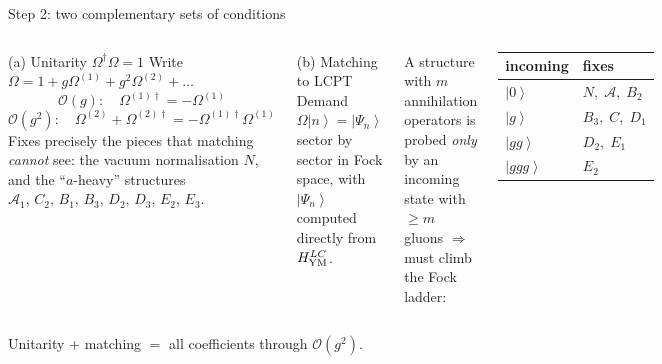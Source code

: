 \documentclass[9pt,aspectratio=169]{beamer}
\newcommand{\hl}[1]{\textcolor{acc}{#1}}
\newcommand{\Om}{\Omega}
\newcommand{\ket}[1]{\left|#1\right\rangle}
\begin{document}
\begin{frame}{Step 2: two complementary sets of conditions}
\begin{columns}[T,onlytextwidth]
\begin{block}{(a) Unitarity $\Om^{\dagger}\Om=1$}
Write $\Om=1+g\Om^{(1)}+g^{2}\Om^{(2)}+\dots$
\[
\mathcal{O}(g):\quad \Om^{(1)\dagger}=-\Om^{(1)}
\]
\[
\mathcal{O}(g^{2}):\quad \Om^{(2)}+\Om^{(2)\dagger}=-\Om^{(1)\dagger}\Om^{(1)}
\]
{\small Fixes precisely the pieces that matching \emph{cannot} see:
the vacuum normalisation $N$, and the ``$a$-heavy'' structures
$\mathcal{A}_1,\,C_2,\,B_1,\,B_3,\,D_2,\,D_3,\,E_2,\,E_3$.}
\end{block}

\begin{block}{(b) Matching to LCPT}
Demand $\Om\ket{n}=\ket{\Psi_{n}}$ sector by sector in Fock space, with
$\ket{\Psi_n}$ computed \hl{directly from $H^{LC}_{\rm YM}$}.
\end{block}
\medskip
{\small A structure with $m$ annihilation operators is probed \emph{only} by an
incoming state with $\ge m$ gluons $\Rightarrow$ must climb the Fock ladder:}
\begin{center}\small
\begin{tabular}{ll}
\toprule
incoming & fixes\\
\midrule
$\ket{0}$ & $N,\;\mathcal{A},\;B_{2}$\\
$\ket{g}$ & $B_{3},\;C,\;D_{1}$\\
$\ket{gg}$ & $D_{2},\;E_{1}$\\
$\ket{ggg}$ & $E_{2}$\\
\bottomrule
\end{tabular}
\end{center}
\end{columns}
\medskip
\begin{center}
\hl{Unitarity + matching $=$ all coefficients through $\mathcal{O}(g^{2})$.}
\end{center}
\end{frame}
\end{document}
